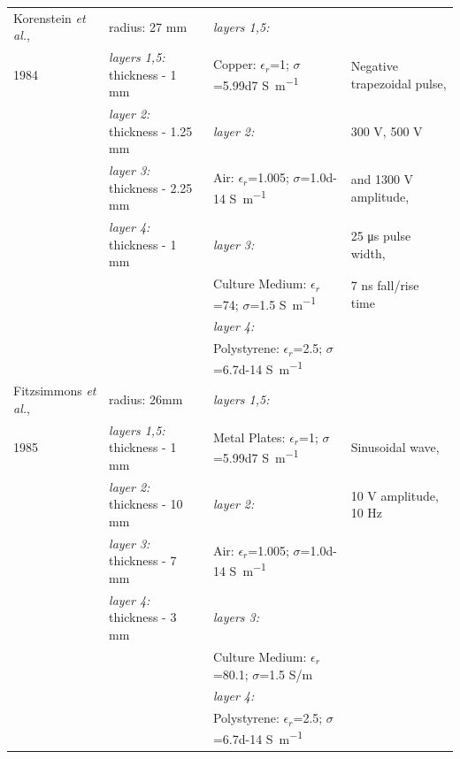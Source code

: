\begin{table}[p]
\begin{tabularx}{\textwidth}{l l l l}
Korenstein \textit{et al.}, & radius: 27 \si{\milli\meter} & \textit{layers 1,5:} & \\
 1984 \cite{Korenstein1984-qb} & \textit{layers 1,5:} thickness - 1 \si{\milli\meter} &  Copper: $\epsilon_{r}$=1; $\sigma$=\num{5.99d7} \si{\siemens\per\meter} & Negative trapezoidal pulse, \\
& \textit{layer 2:} thickness - 1.25 \si{\milli\meter} & \textit{layer 2:}  & 300 \si{\volt}, 500 \si{\volt}  \\
& \textit{layer 3:} thickness - 2.25 \si{\milli\meter} &  Air: $\epsilon_{r}$=1.005; $\sigma$=\num{1.0d-14} \si{\siemens\per\meter} & and 1300 \si{\volt} amplitude, \\
& \textit{layer 4:} thickness - 1 \si{\milli\meter} & \textit{layer 3:} &25 \si{\micro\second} pulse width, \\
& & Culture Medium: $\epsilon_{r}$=74; $\sigma$=\num{1.5} \si{\siemens\per\meter} \cite{Korenstein1984-qb, Visone2018-sa} &  7 \si{\nano\second} fall/rise time \\
&  & \textit{layer 4:} & \\
& & Polystyrene: $\epsilon_{r}$=2.5; $\sigma$=\num{6.7d-14} \si{\siemens\per\meter} \cite{Qi2011-se} & \\ \cmidrule(l){1-4}


Fitzsimmons \textit{et al.},  & radius: 26\si{\milli\meter} & \textit{layers 1,5:} & \\
1985 \cite{Fitzsimmons1986-ks} & \textit{layers 1,5:}  thickness - 1 \si{\milli\meter} & Metal Plates: $\epsilon_{r}$=1; $\sigma$=\num{5.99d7} \si{\siemens\per\meter} & Sinusoidal wave, \\
& \textit{layer 2:} thickness - 10 \si{\milli\meter} & \textit{layer 2:} & 10 \si{\volt} amplitude, 10 \si{\hertz} \\
& \textit{layer 3:} thickness - 7 \si{\milli\meter} & Air: $\epsilon_{r}$=1.005; $\sigma$=\num{1.0d-14} \si{\siemens\per\meter} \cite{Seran2017-qg} & \\
& \textit{layer 4:} thickness - 3 \si{\milli\meter} & \textit{layers 3:} & \\
& & Culture Medium: $\epsilon_{r}$=80.1; $\sigma$=1.5 S/m \cite{Visone2018-sa} & \\
& & \textit{layer 4:} & \\
& & Polystyrene: $\epsilon_{r}$=2.5; $\sigma$=\num{6.7d-14} \si{\siemens\per\meter} \cite{Qi2011-se} & \\ \cmidrule(l){1-4}



\end{tabularx}
\end{table}

